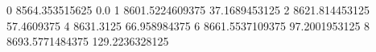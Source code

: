 0 8564.353515625 0.0
1 8601.5224609375 37.1689453125
2 8621.814453125 57.4609375
4 8631.3125 66.958984375
6 8661.5537109375 97.2001953125
8 8693.5771484375 129.2236328125
